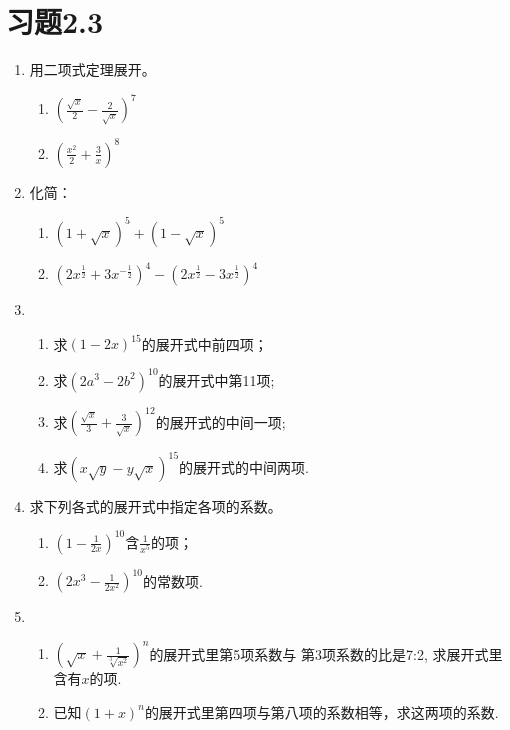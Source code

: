 \section*{习题2.3}
\begin{enumerate}
    \item 用二项式定理展开。
\begin{multicols}{2}
\begin{enumerate}[(1)]
    \item $\left( \frac {\sqrt {x}}2- \frac 2{\sqrt {x}}\right) ^{7}$
    \item $\left( \frac {x^{2}}2+ \frac {3}{x}\right) ^{8}$
\end{enumerate}    
\end{multicols}
\item 化简：
\begin{enumerate}[(1)]
    \item $(1+\sqrt{x})^{5}+(1-\sqrt{x})^{5}$
    \item $\left( 2x^{\tfrac 12}+ 3x^{- \tfrac 12}\right) ^{4}- \left( 2x^{\tfrac 12}- 3x^{\tfrac 12}\right) ^{4}$
\end{enumerate}
\item \begin{enumerate}[(1)]
    \item 求$(1-2x)^{15}$的展开式中前四项；
    \item 求$(2a^{3}-2b^{2})^{10}$的展开式中第11项;
    \item 求$\left(\frac{\sqrt{x}}{3}+\frac{3}{\sqrt{x}}\right)^{12}$的展开式的中间一项;
\item 求$(x\sqrt{y}-y\sqrt{x})^{15}$的展开式的中间两项.
\end{enumerate}
\item 求下列各式的展开式中指定各项的系数。
\begin{enumerate}[(1)]
    \item $\left( 1- \frac 1{2x}\right)^{10}$含$\frac1{x^5}$的项；
    \item $\left(2x^{3}-\frac{1}{2x^{2}}\right)^{10}$的常数项.
\end{enumerate}
 
\item \begin{enumerate}[(1)]
    \item $\left({\sqrt {x}} + \frac 1{\sqrt [3]{x^{2}}}\right) ^{n}$的展开式里第5项系数与
第3项系数的比是7:2, 求展开式里含有$x$的项.
\item 已知$(1+x)^n$的展开式里第四项与第八项的系数相等，求这两项的系数.
\end{enumerate}


\end{enumerate}
